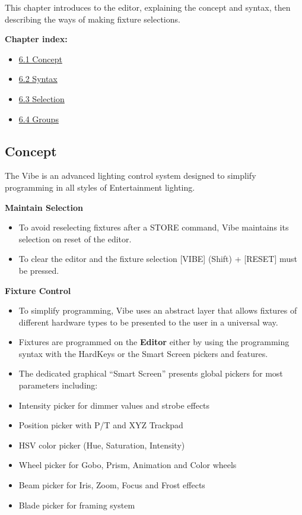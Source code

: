 \documentclass[
]{article}
\providecommand{\tightlist}{%
  \setlength{\itemsep}{0pt}\setlength{\parskip}{0pt}}
\begin{document}
This chapter introduces to the editor, explaining the concept and syntax, then describing the ways of making fixture selections.

\textbf{Chapter index:}

\begin{itemize}
\tightlist
\item
  \protect\hyperlink{Concept-6.1}{6.1 Concept}
\item
  \protect\hyperlink{Syntax-6.2}{6.2 Syntax}
\item
  \protect\hyperlink{Selection-6.3}{6.3 Selection}
\item
  \protect\hyperlink{Groups-6.4}{6.4 Groups}
\end{itemize}

\hypertarget{Concept-6.1}{%
\subsection{Concept}\label{Concept-6.1}}

The Vibe is an advanced lighting control system designed to simplify programming in all styles of Entertainment lighting.

\textbf{Maintain Selection}

\begin{itemize}
\item
  To avoid reselecting fixtures after a STORE command, Vibe maintains its selection on reset of the editor.
\item
  To clear the editor and the fixture selection {[}VIBE{]} (Shift) + {[}RESET{]} must be pressed.
\end{itemize}

\textbf{Fixture Control}

\begin{itemize}
\item
  To simplify programming, Vibe uses an abstract layer that allows fixtures of different hardware types to be presented to the user in a universal way.
\item
  Fixtures are programmed on the \textbf{Editor} either by using the programming syntax with the HardKeys or the Smart Screen pickers and features.
\item
  The dedicated graphical ``Smart Screen'' presents global pickers for most parameters including:
\item
  Intensity picker for dimmer values and strobe effects
\item
  Position picker with P/T and XYZ Trackpad
\item
  HSV color picker (Hue, Saturation, Intensity)
\item
  Wheel picker for Gobo, Prism, Animation and Color wheels
\item
  Beam picker for Iris, Zoom, Focus and Frost effects
\item
  Blade picker for framing system
\end{itemize}
\end{document}
